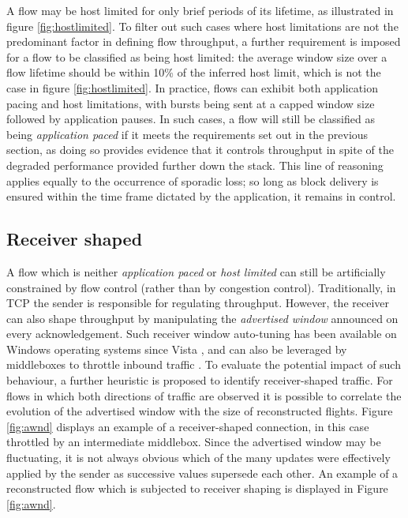 A flow may be host limited for only brief periods of its lifetime, as illustrated in figure \ref{fig:hostlimited}.
To filter out such cases where host limitations are not the predominant factor in defining flow throughput, a further requirement is imposed for a flow to be classified as being host limited: the average window size over a flow lifetime should be within 10\% of the inferred host limit, which is not the case in figure \ref{fig:hostlimited}.
In practice, flows can exhibit both application pacing and host limitations, with bursts being sent at a capped window size followed by application pauses.
In such cases, a flow will still be classified as being \emph{application paced} if it meets the requirements set out in the previous section, as doing so provides evidence that it controls throughput in spite of the degraded performance provided further down the stack. 
This line of reasoning applies equally to the occurrence of sporadic loss; so long as block delivery is ensured within the time frame dictated by the application, it remains in control.

\subsection{Receiver shaped}
\label{section:rate:recv}

A flow which is neither \emph{application paced} or \emph{host limited} can still be artificially constrained by flow control (rather than by congestion control).
Traditionally, in \ac{TCP} the sender is responsible for regulating throughput. 
However, the receiver can also shape throughput by manipulating the \emph{advertised window} announced on every acknowledgement.
Such receiver window auto-tuning has been available on Windows operating systems since Vista \cite{vistaReceiveWindow}, and can also be leveraged by middleboxes to throttle inbound traffic \cite{appEx}.
To evaluate the potential impact of such behaviour, a further heuristic is proposed to identify receiver-shaped traffic.
For flows in which both directions of traffic are observed it is possible to correlate the evolution of the advertised window with the size of reconstructed flights.
Figure \ref{fig:awnd} displays an example of a receiver-shaped connection, in this case throttled by an intermediate middlebox.
Since the advertised window may be fluctuating, it is not always obvious which of the many updates were effectively applied by the sender as successive values supersede each other.
An example of a reconstructed flow which is subjected to receiver shaping is displayed in Figure \ref{fig:awnd}.

